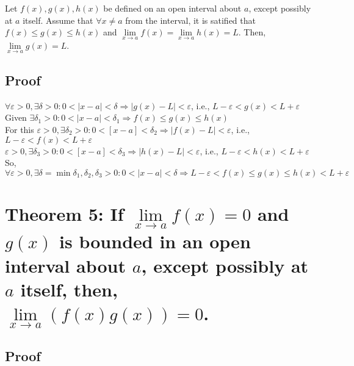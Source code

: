 \documentclass[fleqn]{article}
\begin{document}
Let $f(x), g(x), h(x)$ be defined on an open interval about $a$, except possibly at $a$ itself. Assume that $\forall x \neq a$ from the interval, it is satified that $f(x) \leq g(x) \leq h(x)$ and $\lim\limits_{x \rightarrow a} f(x) = \lim\limits_{x \rightarrow a} h(x) = L$. Then, $\lim\limits_{x \rightarrow a} g(x) = L$.

\subsection*{Proof}

$\forall \varepsilon > 0, \exists \delta > 0 : 0 < \left|x - a\right| < \delta \Rightarrow \left|g(x) - L\right| < \varepsilon$, i.e., $L - \varepsilon < g(x) < L + \varepsilon$\\
Given $\exists \delta_1 > 0 : 0 < \left|x - a\right| < \delta_1 \Rightarrow f(x) \leq g(x) \leq h(x)$\\
For this $\varepsilon > 0, \exists \delta_2 > 0 : 0 < \left[x - a\right] < \delta_2 \Rightarrow \left|f(x) - L\right| < \varepsilon$, i.e., $L - \varepsilon < f(x) < L + \varepsilon$\\
$\varepsilon > 0, \exists \delta_3 > 0 : 0 < \left[x - a\right] < \delta_3 \Rightarrow \left|h(x) - L\right| < \varepsilon$, i.e., $L - \varepsilon < h(x) < L + \varepsilon$\\
So, $\forall \varepsilon > 0, \exists \delta = \min{\delta_1, \delta_2, \delta_3} > 0 : 0 < \left|x - a\right| < \delta \Rightarrow L-\varepsilon < f(x) \leq g(x) \leq h(x) < L + \varepsilon$

\section{Theorem 5: If $\lim\limits_{x \rightarrow a} f(x) = 0$ and $g(x)$ is bounded in an open interval about $a$, except possibly at $a$ itself, then, $\lim\limits_{x \rightarrow a}(f(x)g(x)) = 0$.}

\subsection*{Proof}
\end{document}
